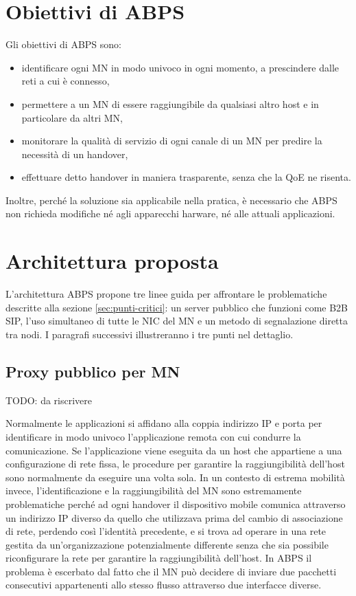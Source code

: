 \documentclass[12pt,a4paper,openright,twoside]{book}
\begin{document}
\section {Obiettivi di ABPS}

Gli obiettivi di ABPS sono:

\begin{itemize}
\item identificare ogni MN in modo univoco in ogni momento, a
  prescindere dalle reti a cui è connesso,
\item permettere a un MN di essere raggiungibile da qualsiasi altro
  host e in particolare da altri MN,
\item monitorare la qualità di servizio di ogni canale di un MN per
  predire la necessità di un handover,
\item effettuare detto handover in maniera trasparente, senza che la
  QoE ne risenta.
\end{itemize}

Inoltre, perché la soluzione sia applicabile nella pratica, è
necessario che ABPS non richieda modifiche né agli apparecchi harware,
né alle attuali applicazioni.

\section {Architettura proposta}
L'architettura ABPS propone tre linee guida per affrontare le
problematiche descritte alla sezione \ref{sec:punti-critici}: un
server pubblico che funzioni come B2B SIP, l'uso simultaneo di tutte
le NIC del MN e un metodo di segnalazione diretta tra nodi. I
paragrafi successivi illustreranno i tre punti nel dettaglio.

\subsection{Proxy pubblico per MN}
TODO: da riscrivere

Normalmente le applicazioni si affidano alla coppia indirizzo IP e
porta per identificare in modo univoco l'applicazione remota con cui
condurre la comunicazione. Se l'applicazione viene eseguita da un host
che appartiene a una configurazione di rete fissa, le procedure per
garantire la raggiungibilità dell'host sono normalmente da eseguire
una volta sola. In un contesto di estrema mobilità invece,
l'identificazione e la raggiungibilità del MN sono estremamente
problematiche perché ad ogni handover il dispositivo mobile comunica
attraverso un indirizzo IP diverso da quello che utilizzava prima del
cambio di associazione di rete, perdendo così l'identità precedente, e
si trova ad operare in una rete gestita da un'organizzazione
potenzialmente differente senza che sia possibile riconfigurare la
rete per garantire la raggiungibilità dell'host. In ABPS il problema è
escerbato dal fatto che il MN può decidere di inviare due pacchetti
consecutivi appartenenti allo stesso flusso attraverso due interfacce
diverse.
\end{document}
